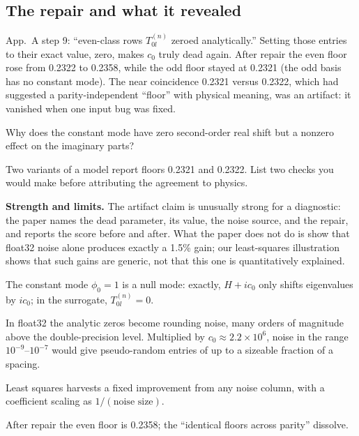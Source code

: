 \subsection{The repair and what it revealed}

App.~A step 9: ``even-class rows $T^{(n)}_{0l}$ zeroed analytically.'' Setting those entries to their exact value, zero, makes $c_0$ truly dead again. After repair the even floor rose from 0.2322 to 0.2358, while the odd floor stayed at 0.2321 (the odd basis has no constant mode). The near coincidence 0.2321 versus 0.2322, which had suggested a parity-independent ``floor'' with physical meaning, was an artifact: it vanished when one input bug was fixed.

\begin{checkpoint}
Why does the constant mode have zero second-order real shift but a nonzero effect on the imaginary parts?
\end{checkpoint}

\begin{checkpoint}
Two variants of a model report floors 0.2321 and 0.2322. List two checks you would make before attributing the agreement to physics.
\end{checkpoint}

\textbf{Strength and limits.} The artifact claim is unusually strong for a diagnostic: the paper names the dead parameter, its value, the noise source, and the repair, and reports the score before and after. What the paper does not do is show that float32 noise alone produces exactly a 1.5\% gain; our least-squares illustration shows that such gains are generic, not that this one is quantitatively explained.

\begin{keyideas}
\item The constant mode $\phi_0=1$ is a null mode: exactly, $H+ic_0$ only shifts eigenvalues by $ic_0$; in the surrogate, $T^{(n)}_{0l}=0$.
\item In float32 the analytic zeros become rounding noise, many orders of magnitude above the double-precision level. Multiplied by $c_0\approx2.2\times10^6$, noise in the range $10^{-9}$--$10^{-7}$ would give pseudo-random entries of up to a sizeable fraction of a spacing.
\item Least squares harvests a fixed improvement from any noise column, with a coefficient scaling as $1/(\text{noise size})$.
\item After repair the even floor is 0.2358; the ``identical floors across parity'' dissolve.
\end{keyideas}


